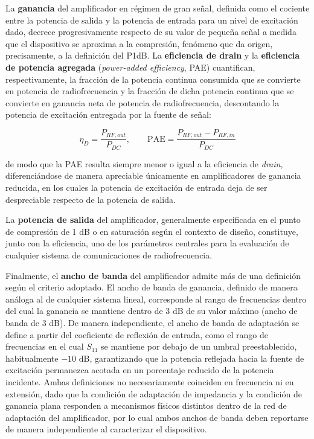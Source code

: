 La \textbf{ganancia} del amplificador en régimen de gran señal, definida como el cociente entre la potencia de salida y la potencia de entrada para un nivel de excitación dado, decrece progresivamente respecto de su valor de pequeña señal a medida que el dispositivo se aproxima a la compresión, fenómeno que da origen, precisamente, a la definición del P1dB. La \textbf{eficiencia de drain} y la \textbf{eficiencia de potencia agregada} (\textit{power-added efficiency}, PAE) cuantifican, respectivamente, la fracción de la potencia continua consumida que se convierte en potencia de radiofrecuencia y la fracción de dicha potencia continua que se convierte en ganancia neta de potencia de radiofrecuencia, descontando la potencia de excitación entregada por la fuente de señal:

\begin{equation}
    \eta_D = \frac{P_{RF,out}}{P_{DC}}, \qquad \text{PAE} = \frac{P_{RF,out} - P_{RF,in}}{P_{DC}}
    \label{eq:pae_definicion}
\end{equation}

de modo que la PAE resulta siempre menor o igual a la eficiencia de \textit{drain}, diferenciándose de manera apreciable únicamente en amplificadores de ganancia reducida, en los cuales la potencia de excitación de entrada deja de ser despreciable respecto de la potencia de salida.

La \textbf{potencia de salida} del amplificador, generalmente especificada en el punto de compresión de 1 dB o en saturación según el contexto de diseño, constituye, junto con la eficiencia, uno de los parámetros centrales para la evaluación de cualquier sistema de comunicaciones de radiofrecuencia.

Finalmente, el \textbf{ancho de banda} del amplificador admite más de una definición según el criterio adoptado. El ancho de banda de ganancia, definido de manera análoga al de cualquier sistema lineal, corresponde al rango de frecuencias dentro del cual la ganancia se mantiene dentro de 3 dB de su valor máximo (ancho de banda de 3 dB). De manera independiente, el ancho de banda de adaptación se define a partir del coeficiente de reflexión de entrada, como el rango de frecuencias en el cual $S_{11}$ se mantiene por debajo de un umbral preestablecido, habitualmente $-10\text{ dB}$, garantizando que la potencia reflejada hacia la fuente de excitación permanezca acotada en un porcentaje reducido de la potencia incidente. Ambas definiciones no necesariamente coinciden en frecuencia ni en extensión, dado que la condición de adaptación de impedancia y la condición de ganancia plana responden a mecanismos físicos distintos dentro de la red de adaptación del amplificador, por lo cual ambos anchos de banda deben reportarse de manera independiente al caracterizar el dispositivo.


